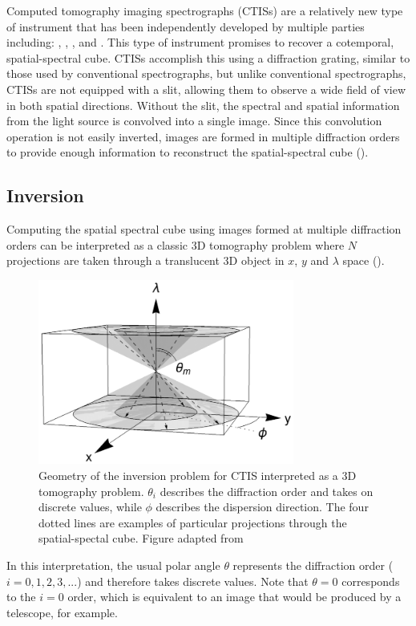 \documentclass{article}
\begin{document}
			Computed tomography imaging spectrographs (CTISs) are a relatively new type of instrument that has been independently developed by multiple parties including: \cite{Okamoto:91}, \cite{bulygin:92}, \cite{Descour:95}, and \cite{kankel1}. This type of instrument promises to recover a cotemporal, spatial-spectral cube. CTISs accomplish this using a diffraction grating, similar to those used by conventional spectrographs, but unlike conventional spectrographs, CTISs are not equipped with a slit, allowing them to observe a wide field of view in both spatial directions. Without the slit, the spectral and spatial information from the light source is convolved into a single image. Since this convolution operation is not easily inverted, images are formed in multiple diffraction orders to provide enough information to reconstruct the spatial-spectral cube (\cite{inversion}).	
			 
		\subsection{Inversion}
		
			Computing the spatial spectral cube using images formed at multiple diffraction orders can be interpreted as a classic 3D tomography problem where $N$ projections are taken through a translucent 3D object in $x$, $y$ and $\lambda$ space (\cite{Bulygin:05}).
			\begin{figure}[h!]
				\centering
				\includegraphics[width=0.75\textwidth]{figures/tomography}
				\caption{Geometry of the inversion problem for CTIS interpreted as a 3D tomography problem. $\theta_i$ describes the diffraction order and takes on discrete values, while $\phi$ describes the dispersion direction. The four dotted lines are examples of particular projections through the spatial-spectal cube. Figure adapted from \cite{Bulygin:05}}
				\label{tomography}
			\end{figure}
			In this interpretation, the usual polar angle $\theta$ represents the diffraction order ($i=0,1,2,3,...$) and therefore takes discrete values. Note that $\theta=0$ corresponds to the $i=0$ order, which is equivalent to an image that would be produced by a telescope, for example.
			
\end{document}
